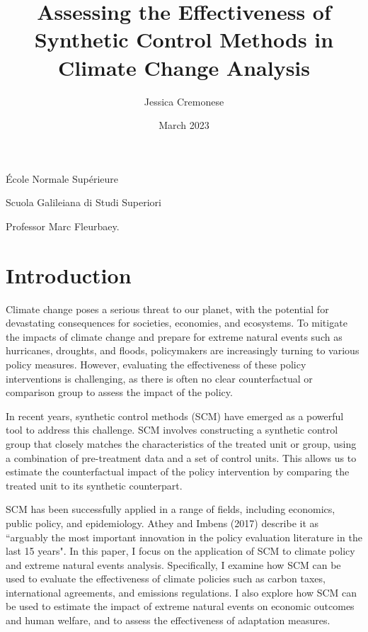 \documentclass[12pt,a4paper,draft]{article}
\begin{document}
\begin{titlepage}
\title{Assessing the Effectiveness of Synthetic Control Methods in Climate Change Analysis}
\author{Jessica Cremonese}
\date{March 2023}
\maketitle

\vspace{2cm}

\begin{center}
    École Normale Supérieure
\end{center}

\begin{center}
    Scuola Galileiana di Studi Superiori
\end{center}

\vspace{7cm}
Professor Marc Fleurbaey.


\end{titlepage}

\tableofcontents


\newpage


\section{Introduction} %

Climate change poses a serious threat to our planet, with the potential for 
devastating consequences for societies, economies, and ecosystems. To mitigate the impacts 
of climate change and prepare for extreme natural events such as hurricanes, droughts, 
and floods, policymakers are increasingly turning to various policy measures. However, 
evaluating the effectiveness of these policy interventions is challenging, as there is 
often no clear counterfactual or comparison group to assess the impact of the policy.

In recent years, synthetic control methods (SCM) have emerged as a powerful tool to 
address this challenge. SCM involves constructing a synthetic control group that 
closely matches the characteristics of the treated unit or group, using a combination 
of pre-treatment data and a set of control units. This allows us to estimate the 
counterfactual impact of the policy intervention by comparing the treated unit to 
its synthetic counterpart.

SCM has been successfully applied in a range of fields, including economics, public 
policy, and epidemiology. Athey and Imbens (2017) describe it as ``arguably the most 
important innovation in the policy evaluation literature in the last 15 years".
In this paper, I focus on the application of SCM to climate policy and extreme 
natural events analysis. Specifically, I examine how SCM can be used to evaluate 
the effectiveness of climate policies such as carbon taxes, international agreements, 
and emissions regulations. 
I also explore how SCM can be used to estimate the impact of extreme natural 
events on economic outcomes and human welfare, and to assess the effectiveness 
of adaptation measures.
\end{document}
